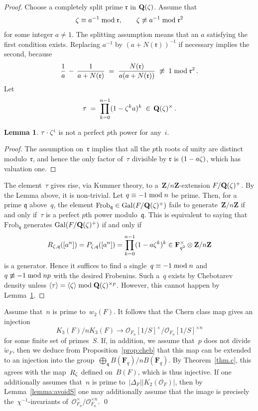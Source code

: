 \documentclass[12pt,reqno]{amsart}
\theoremstyle{definition}
\newtheorem{lemma}[theorem]{Lemma}
\newcommand{\changed}[1]{{#1}}
\def\={\;=\;}
\def\mod{\;\text{\rm mod}\;}
\def\Q{\mathbf Q}   %
\def\Z{\mathbf Z}   %
\def\F{\mathbf F}   %
\def\nn{n}
\def\r{\mathfrak{r}}
\def\Frob{\mathrm{Frob}}
\def\q{\mathfrak{q}}
\def\Gal{\mathrm{Gal}}
\def\OL{\mathcal{O}}
\begin{document}
\begin{proof}
Choose a completely split prime $\r$ in $\Q(\z)$. Assume that
$$
\z \equiv  a^{-1} \mod \r, \qquad \z \not\equiv a^{-1} \mod \r^2
$$
for some integer $a \ne 1$. The splitting assumption means that an $a$ 
satisfying the first condition exists\changed{. Replacing} $a^{-1}$ by 
$(a+N(\r))^{-1}$ if necessary implies the second, because
$$
\frac{1}{a} \,-\, \frac{1}{a+N(\r)} \= 
\frac{N(\r)}{a(a+N(\r))} \;\not\equiv \; 1 \mod \r^2\,.
$$
Let
$$
\tau \= \prod_{k=0}^{\nn-1} (1-\z^ka)^k\;\in\,\Q(\z)^{\times}\,.
$$

\begin{lemma}
\label{lemma:ramified}
$\tau \cdot \zeta^i$ is not a perfect $p$th power for any~$i$.
\end{lemma}
 
\begin{proof} 
The assumption on~$\r$ implies that all the $p$th roots of unity are 
distinct modulo~$\r$,
and hence the only factor of~$\tau$ divisible by $\r$ is $(1 - a \zeta)$, 
which has valuation one.
\end{proof}

The element~$\tau$ gives rise, via Kummer theory, to 
a~$\Z/\nn \Z$-extension $F/\Q(\z)^{+}$.
By the Lemma above, it is non-trivial. Let $q \equiv -1 \mod \nn$
be prime. Then, for a prime $\q$ above~$q$, the element 
$\Frob_{\q} \in \Gal(F/\Q(\z)^{+})$
 fails to generate~$\Z/\nn \Z$ if and only if~$\tau$ is a perfect 
$p$th power modulo~$\q$.  This is equivalent to saying that $\Frob_{\q}$ 
generates $\Gal(F/\Q(\z)^{+})$ if and only if
$$
R_{\z,\q}([a^{\nn}]) = P_{\z,\q}([a^{\nn}]) =  
\prod_{k=0}^{\nn-1} (1 - a \z^k)^k \in \F^{\times}_{q^2} \otimes \Z/\nn \Z
$$
is a generator. 
Hence it suffices to find a single~$q \equiv -1 \mod \nn$
and~$q \not \equiv -1 \mod \nn p$ with the desired Frobenius.
Such a~$q$ exists by Chebotarev density unless 
$\langle \tau \rangle = \langle \z \rangle \mod \Q(\z)^{\times p}$. 
However, this cannot happen by  Lemma~\ref{lemma:ramified}.
\end{proof}

\medskip

Assume that~$n$ is prime to~$w_2(F)$. It follows 
that the Chern class map gives an injection
$$
K_3(F)/\nn K_3(F) \rightarrow 
\OL_{F_{\nn}}[1/S]^{\times}/\OL_{F_{\nn}}[1/S]^{ \times \nn}
$$
for some finite set of primes~$S$.
If, in addition, we assume that~$p$ does not divide~$\widetilde{w}_F$, then
we deduce from  Proposition~\ref{prop:cheb} that this map can be extended to 
an injection into the group~$\bigoplus_{\q} B(\F_q)/n B(\F_q)$.
By Theorem~\ref{thm.c}, this agrees with the map~$R_{\zeta}$ defined on~$B(F)$,
which is thus injective. 
If one additionally assumes that~$n$ is prime  to~$|\Delta_F| |K_2(\OL_F)|$,
then by Lemma~\ref{lemma:avoidS} one may additionally assume that the
image is precisely the~$\chi^{-1}$-invariants 
of~$\OL^{\times}_{F_{\nn}}/\OL_{F_{\nn}}^{\times \nn}$.
\qed
\end{document}

